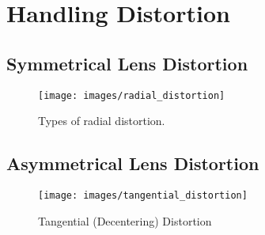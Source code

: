 \section{Handling Distortion}

\subsection{Symmetrical Lens Distortion}

\begin{figure}[h!]
    \centering
    \texttt{[image: images/radial\_distortion]}
    \caption{Types of radial distortion.}
\end{figure}

\subsection{Asymmetrical Lens Distortion}

\begin{figure}[h!]
    \centering
    \texttt{[image: images/tangential\_distortion]}
    \caption{Tangential (Decentering) Distortion}
\end{figure}
